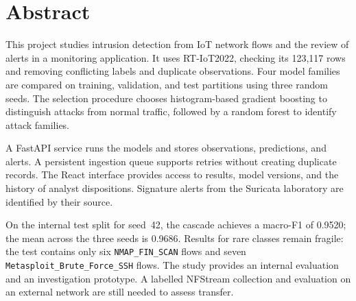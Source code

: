 \chapter*{Abstract}

This project studies intrusion detection from IoT network flows and the review
of alerts in a monitoring application. It uses RT-IoT2022, checking its
123,117 rows and removing conflicting labels and duplicate observations.
Four model families are compared on training, validation, and test partitions
using three random seeds. The selection procedure chooses histogram-based
gradient boosting to distinguish attacks from normal traffic, followed by a
random forest to identify attack families.

A FastAPI service runs the models and stores observations, predictions, and
alerts. A persistent ingestion queue supports retries without creating duplicate
records. The React interface provides access to results, model versions, and
the history of analyst dispositions. Signature alerts from the Suricata
laboratory are identified by their source.

On the internal test split for seed~42, the cascade achieves a macro-F1 of
0.9520; the mean across the three seeds is 0.9686. Results for rare classes
remain fragile: the test contains only six \texttt{NMAP\_FIN\_SCAN} flows and
seven \texttt{Metasploit\_Brute\_Force\_SSH} flows. The study provides an internal
evaluation and an investigation prototype. A labelled NFStream collection and
evaluation on an external network are still needed to assess transfer.
